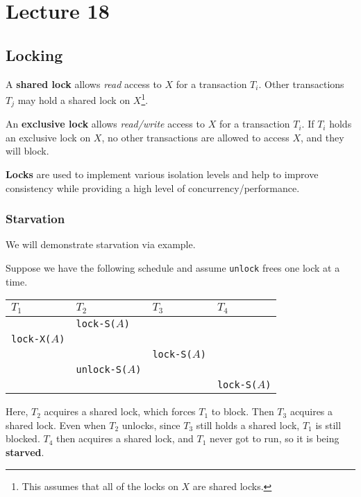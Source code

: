 \documentclass{report}
\newenvironment{definition}[1]{\begin{tcolorbox}[title={Definition: #1}]}{\end{tcolorbox}}
\newenvironment{example}{\begin{tcolorbox}[title={Example},colback=green!5!white,colframe=black!75!green]}{\end{tcolorbox}}
\renewcommand{\bf}[1]{\textbf{{#1}}}
\renewcommand{\tt}[1]{\texttt{{#1}}}
\renewcommand{\it}[1]{\textit{{#1}}}
\begin{document}
\chapter{Lecture 18}
\section{Locking}
\begin{definition}{Shared and Exclusive Lock}
    A \bf{shared lock} allows \it{read} access to $X$ for a transaction $T_i$. Other
    transactions $T_j$ may hold a shared lock on $X$\footnote{This assumes that
    all of the locks on $X$ are shared locks.}.
    \vspace{1em}

    An \bf{exclusive lock} allows \it{read/write} access to $X$ for a
    transaction $T_i$. If $T_i$ holds an exclusive lock on $X$, no other
    transactions are allowed to access $X$, and they will block.
\end{definition}

\bf{Locks} are used to implement various isolation levels and help to improve
consistency while providing a high level of concurrency/performance.

\subsection{Starvation}
We will demonstrate starvation via example.
\begin{example}
    Suppose we have the following schedule and assume \tt{unlock} frees one
    lock at a time.

    {
        \centering
        \begin{tabular}{l|l|l|l}
            $T_1$ & $T_2$ & $T_3$ & $T_4$ \\
            \hline
                  & \tt{lock-S($A$)} & & \\
            \tt{lock-X($A$)} & & & \\
                           & & \tt{lock-S($A$)} & \\
                           & \tt{unlock-S($A$)} & & \\
                           & & & \tt{lock-S($A$)} \\
        \end{tabular}
        \par
    }
    Here, $T_2$ acquires a shared lock, which forces $T_1$ to block. Then $T_3$
    acquires a shared lock. Even when $T_2$ unlocks, since $T_3$ still holds a
    shared lock, $T_1$ is still blocked. $T_4$ then acquires a shared lock, and
    $T_1$ never got to run, so it is being \bf{starved}.
\end{example}
\end{document}
